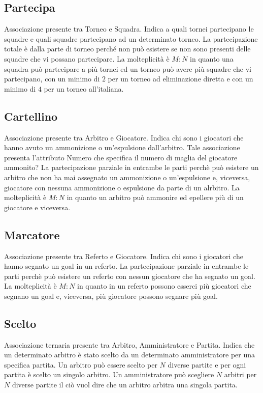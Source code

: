 	\subsection{Partecipa}
	Associazione presente tra Torneo e Squadra.
	Indica a quali tornei partecipano le squadre e quali squadre partecipano ad un determinato torneo.
	La partecipazione totale è dalla parte di torneo perché non può esistere se non sono presenti delle squadre che vi possano partecipare.
	La molteplicità è $M:N$ in quanto una squadra può partecipare a più tornei ed un torneo può avere più squadre che vi partecipano, con un minimo di $2$ per un torneo ad eliminazione diretta e con un minimo di $4$ per un torneo all’italiana.
	
	\subsection{Cartellino}
	Associazione presente tra Arbitro e Giocatore.
	Indica chi sono i giocatori che hanno avuto un ammonizione o un'espulsione dall'arbitro.
	Tale associazione presenta l’attributo Numero che specifica il numero di maglia del giocatore ammonito?
	La partecipazione parziale in entrambe le parti perchè può esistere un arbitro che non ha mai assegnato un ammonizione o un'espulsione e, viceversa, giocatore con nessuna ammonizione o espulsione da parte di un alrbitro.
	La molteplicità è $M:N$ in quanto un arbitro può ammonire ed epellere più di un giocatore e viceversa.
	
	\subsection{Marcatore}
	Associazione presente tra Referto e Giocatore.
	Indica chi sono i giocatori che hanno segnato un goal in un referto.
	La partecipazione parziale in entrambe le parti perchè può esistere un referto con nessun giocatore che ha segnato un goal.
	La molteplicità è $M:N$ in quanto in un referto possono esserci più giocatori che segnano un goal e, viceversa, più giocatore possono segnare più goal.
	
	\subsection{Scelto}
	Associazione ternaria presente tra Arbitro, Amministratore e Partita.
	Indica che un determinato arbitro è stato scelto da un determinato amministratore per una specifica partita.
	Un arbitro può essere scelto per $N$ diverse partite e per ogni partita è scelto un singolo arbitro. Un amministratore può scegliere $N$ arbitri per $N$ diverse partite il ciò vuol dire che un arbitro arbitra una singola partita.
	

